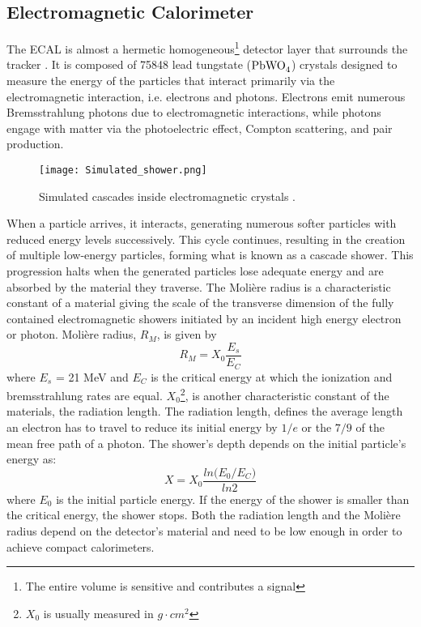 \subsection{\label{sec:exp_CMS_2}Electromagnetic Calorimeter}
The ECAL is almost a hermetic homogeneous\footnote{The entire volume is sensitive and contributes a signal} detector layer that surrounds the
tracker \cite{CMS_sketch, Chatrchyan:1215500, Collaboration_ECAL, ECAL, CERN:ECAL}. It is composed of 75848 lead tungstate ($\ce{PbWO4}$) crystals designed to measure the energy of the particles that interact primarily via the electromagnetic interaction, i.e. electrons and photons. Electrons emit numerous Bremsstrahlung photons due to electromagnetic interactions, while photons engage with matter via the photoelectric effect, Compton scattering, and pair production.
\begin{figure}[H]
    \centering
    \texttt{[image: Simulated\_shower.png]}
    \caption{Simulated cascades inside electromagnetic crystals \cite{Menke}.}
    \label{fig:Shower}
\end{figure}
When a particle arrives, it interacts, generating numerous softer particles with reduced energy levels successively. This cycle continues, resulting in the creation of multiple low-energy particles, forming what is known as a cascade shower. This progression halts when the generated particles lose adequate energy and are absorbed by the material they traverse. The Molière radius is a characteristic constant of a material giving the scale of the transverse dimension of the fully contained electromagnetic showers initiated by an incident high energy electron or photon. Molière radius, $R_M$, is given by \cite{Workman:2022ynf}
\begin{equation}
    R_M = X_0 \frac{E_s}{E_C}
\end{equation}
where $E_s$ = 21 MeV and $E_C$ is the critical energy at which the ionization and bremsstrahlung rates are equal. $X_0$\footnote{$X_0$ is usually measured in $g\cdot cm^{2}$}, is another characteristic constant of the materials, the radiation length. The radiation length, defines the average length an electron has to travel to reduce its initial energy by $1/e$ or the $7/9$ of the mean free path of a photon. The shower's depth depends on the initial particle's energy as:
\begin{equation}
    X = X_0\frac{ln\big(E_0/E_C\big)}{ln2}
\end{equation}
where $E_0$ is the initial particle energy. If the energy of the shower is smaller than the critical energy, the shower stops. Both the radiation length and the Molière radius depend on the detector’s material and need to be low enough in order to achieve compact calorimeters.\\

